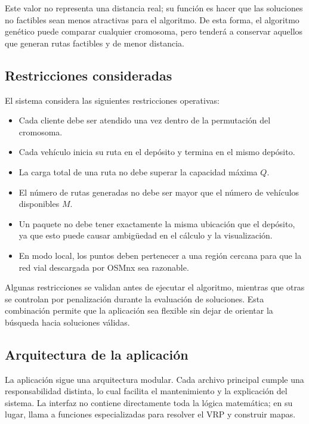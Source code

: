 \documentclass[runningheads]{llncs}
\begin{document}
Este valor no representa una distancia real; su funci\'on es hacer que las
soluciones no factibles sean menos atractivas para el algoritmo. De esta forma,
el algoritmo gen\'etico puede comparar cualquier cromosoma, pero tender\'a a
conservar aquellos que generan rutas factibles y de menor distancia.

\subsection{Restricciones consideradas}

El sistema considera las siguientes restricciones operativas:

\begin{itemize}
    \item Cada cliente debe ser atendido una vez dentro de la permutaci\'on del
    cromosoma.
    \item Cada veh\'iculo inicia su ruta en el dep\'osito y termina en el mismo
    dep\'osito.
    \item La carga total de una ruta no debe superar la capacidad m\'axima $Q$.
    \item El n\'umero de rutas generadas no debe ser mayor que el n\'umero de
    veh\'iculos disponibles $M$.
    \item Un paquete no debe tener exactamente la misma ubicaci\'on que el
    dep\'osito, ya que esto puede causar ambig\"uedad en el c\'alculo y la
    visualizaci\'on.
    \item En modo local, los puntos deben pertenecer a una regi\'on cercana para
    que la red vial descargada por OSMnx sea razonable.
\end{itemize}

Algunas restricciones se validan antes de ejecutar el algoritmo, mientras que
otras se controlan por penalizaci\'on durante la evaluaci\'on de soluciones. Esta
combinaci\'on permite que la aplicaci\'on sea flexible sin dejar de orientar la
b\'usqueda hacia soluciones v\'alidas.

\subsection{Arquitectura de la aplicaci\'on}

La aplicaci\'on sigue una arquitectura modular. Cada archivo principal cumple una
responsabilidad distinta, lo cual facilita el mantenimiento y la explicaci\'on
del sistema. La interfaz no contiene directamente toda la l\'ogica matem\'atica;
en su lugar, llama a funciones especializadas para resolver el VRP y construir
mapas.
\end{document}
